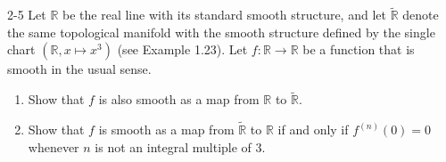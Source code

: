 \begin{problem}{2-5}
    Let \( \mathbb{R} \) be the real line with its standard smooth structure, and let \( \widetilde{\mathbb{R}} \) denote the same topological manifold with the smooth structure defined by the single chart \( (\mathbb{R}, x \mapsto x^{3}) \) (see Example 1.23). Let \( f: \mathbb{R} \to \mathbb{R} \) be a function that is smooth in the usual sense.
    \begin{enumerate}[itemsep=0pt,label={(\alph*)}]
        \item Show that \( f \) is also smooth as a map from \( \mathbb{R} \) to \( \widetilde{\mathbb{R}} \).
        \item Show that \( f \) is smooth as a map from \( \widetilde{\mathbb{R}} \) to \( \mathbb{R} \) if and only if \( f^{(n)}(0) = 0 \) whenever \( n \) is not an integral multiple of 3.
    \end{enumerate}
\end{problem}

